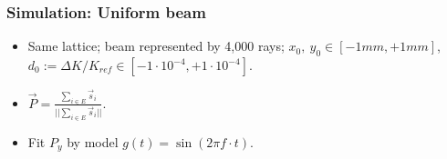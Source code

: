 \documentclass{beamer}
\begin{document}
\begin{frame}
\begin{columns}
\begin{column}{.5\textwidth}
\begin{center}
      \end{center}
    \end{column}
  \end{columns}
\end{frame}

\begin{frame}
  \frametitle{Simulation: Uniform beam}
  \begin{itemize}
    \item Same lattice; beam represented by 4,000 rays; $x_0,~y_0\in [-1mm, +1mm]$, $d_0:=\Delta K/K_{ref} \in [-1\cdot10^{-4}, +1\cdot10^{-4}]$.
    \item $\vec P = \frac{\sum_{i\in E} \vec s_i}{||\sum_{i\in E} \vec s_i||}.$
    \item Fit $P_y$ by model $g(t) = \sin(2\pi f\cdot t)$.
  \end{itemize}
\end{frame}
\end{document}

